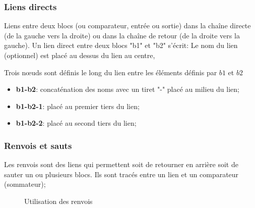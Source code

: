 \documentclass[a4paper,11pt]{article}                      %
\begin{document}
\subsubsection{Liens directs} 
Liens entre deux blocs (ou comparateur, entrée ou sortie) dans la chaîne directe (de la gauche vers la droite)  ou dans la chaîne de retour (de la droite vers la gauche). Un lien direct entre deux blocs "b1" et "b2" s'écrit: 
Le nom du lien (optionnel) est placé au dessus du lien au centre, 

Trois n\oe uds sont définis le long du lien entre les éléments définis par $b1$  et $b2$

\begin{itemize}
\item \textbf{b1-b2}: concaténation des noms avec un tiret "-" placé au milieu du lien;
\item \textbf{b1-b2-1}: placé au premier tiers du lien;
\item \textbf{b1-b2-2}: placé au second tiers du lien;
 
\end{itemize}

\begin{tikzexample}[title=,   righthand width=0.45\textwidth,]
\end{tikzexample}


\subsubsection{Renvois et sauts}

Les renvois sont des liens qui permettent soit de retourner en arrière soit de sauter un ou plusieurs blocs. Ils sont tracés entre un lien et un comparateur (sommateur);


\begin{figure}[!htb]
\centering

\begin{tikzexample}[title=,   righthand width=0.5\textwidth,]
\end{tikzexample}
 
 
\caption{Utilisation des renvois}
\label{fig:renvois1}
\end{figure}
\end{document}
